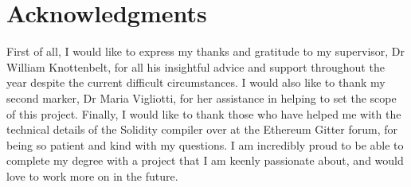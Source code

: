 \section*{Acknowledgments}
First of all, I would like to express my thanks and gratitude to my
supervisor, Dr William Knottenbelt, for all his insightful advice and support throughout the year 
despite the current difficult circumstances.
I would also like to thank my second marker, Dr Maria Vigliotti,
for her assistance in helping to set the scope of this project.
Finally, I would like to thank those who have helped me with the technical details
of the Solidity compiler over at the Ethereum Gitter forum, for being so patient
and kind with my questions. I am incredibly proud to be able to complete my degree
with a project that I am keenly passionate about, and would love to work more on in the future.

\clearpage{\pagestyle{empty}\cleardoublepage}